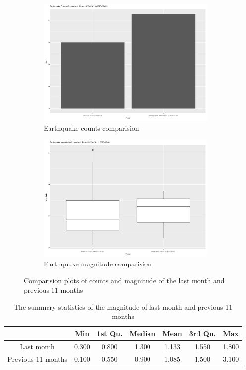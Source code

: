 \documentclass[11pt]{article}
\begin{document}
\begin{CJK}{UTF8}{gbsn}
\begin{figure}[h]
	\centering
    \begin{subfigure}{0.45\linewidth}
        \includegraphics[width=8.75cm]{../../outputs/com_count_bar.png}
        \caption{Earthquake counts comparision}
        \label{fig:2-1}
    \end{subfigure}
    \hfill
    \begin{subfigure}{0.5\linewidth}
        \includegraphics[width=8.75cm]{../../outputs/com_mag_box.png}
        \caption{Earthquake magnitude comparision}
        \label{fig:2-2}
    \end{subfigure}
    \caption{Comparision plots of counts and magnitude of the last month and previous 11 months }
    \label{fig:2}
\end{figure}

\begin{table}[h]
\begin{tabular}{c|cccccc}
                  & Min   & 1st Qu.        & Median & Mean  & 3rd Qu. & Max   \\ \hline
Last month        & 0.300 & 0.800          & 1.300  & 1.133 & 1.550   & 1.800 \\
Previous 11 months & 0.100 & 0.550 & 0.900  & 1.085 & 1.500   & 3.100
\end{tabular}
\centering
\caption{The summary statistics of the magnitude of last month and previous 11 months}
\label{Tab:1}
\end{table}


\end{CJK}
\end{document}

